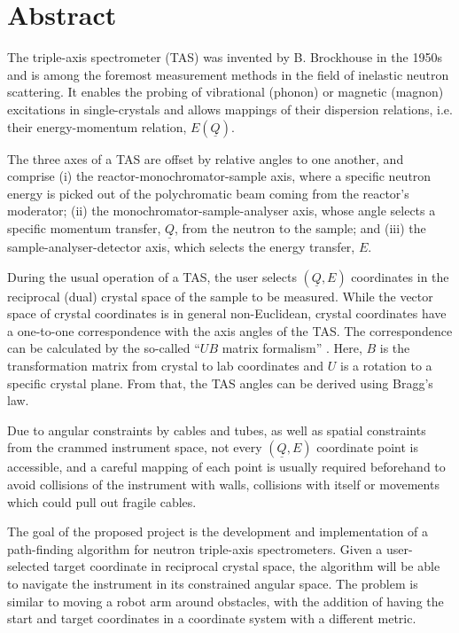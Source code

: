 %
%

\chapter*{Abstract}

The triple-axis spectrometer (TAS) \cite{Shirane2002} was invented by B. Brockhouse in the 1950s and 
is among the foremost measurement methods in the field of inelastic neutron scattering. 
It enables the probing of vibrational (phonon) or magnetic (magnon) excitations in single-crystals and allows 
mappings of their dispersion relations, i.e. their energy-momentum relation, $E\left( \underline{Q} \right)$.

The three axes of a TAS are offset by relative angles to one another, and comprise 
(i) the reactor-monochromator-sample axis, where a specific neutron energy is picked out of the polychromatic 
beam coming from the reactor's moderator; 
(ii) the monochromator-sample-analyser axis, whose angle selects a specific momentum transfer, $\underline{Q}$, 
from the neutron to the sample; and 
(iii) the sample-analyser-detector axis, which selects the energy transfer, $E$.

During the usual operation of a TAS, the user selects $\left( \underline{Q}, E \right)$ coordinates in the reciprocal (dual)
crystal space of the sample to be measured. While the vector space of crystal coordinates 
is in general non-Euclidean, crystal coordinates have a one-to-one correspondence with the axis angles 
of the TAS. The correspondence can be calculated by the so-called ``$UB$ matrix formalism'' \cite{Lumsden2005}. 
Here, $B$ is the transformation matrix from crystal to lab coordinates and $U$ is a rotation to a specific 
crystal plane. From that, the TAS angles can be derived using Bragg's law.

Due to angular constraints by cables and tubes, as well as spatial constraints from the crammed instrument space, 
not every $\left( \underline{Q}, E \right)$ coordinate point is accessible, and a careful mapping of each point is
usually required beforehand to avoid collisions of the instrument with walls, collisions with itself or movements
which could pull out fragile cables.

The goal of the proposed project is the development and implementation of a path-finding algorithm for 
neutron triple-axis spectrometers. Given a user-selected target coordinate in reciprocal crystal space, 
the algorithm will be able to navigate the instrument in its constrained angular space. The problem is similar to 
moving a robot arm around obstacles, with the addition of having the start and target coordinates in a 
coordinate system with a different metric.

